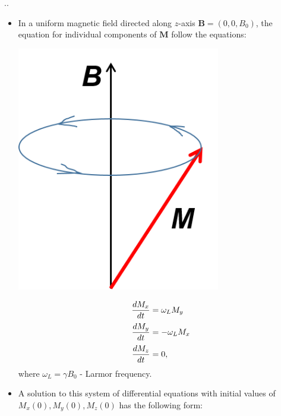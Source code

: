 \documentclass[handout]{beamer}
\begin{document}
\begin{frame}{\thesection.\thesubsection. \insertsubsection}
	\begin{itemize}[<+>]
		\item 
		    In a uniform magnetic field directed along $z$-axis $\bm{B} = (0, 0, B_0)$, the equation for individual components of $\bm{M}$ follow the equations:
		    
		    \begin{minipage}[b][4cm]{0.4\textwidth}
		    	\centering
		    	\includegraphics[width=0.7\textwidth]{precession.png}
		    \end{minipage}
		    \hspace{0.1cm}		    
		    \begin{minipage}[b][4cm]{0.4\textwidth}
		        \centering
		    	 \begin{equation} \label{precession}
		    	 \setlength{\jot}{5pt}
		    	 \begin{aligned}
		    	 \dfrac{dM_x}{dt} & =  \omega_L M_y \\
		    	 \dfrac{dM_y}{dt} & =  -\omega_L M_x \\
		    	 \dfrac{dM_z}{dt} & =  0,
		    	 \end{aligned}
		    	 \end{equation}
		    	 where $\omega_L = \gamma B_0$ - \alert{Larmor frequency}.
		    \end{minipage}
		    
		    
		\item
			A solution to this system of differential equations with initial values of $M_x(0), M_y(0), M_z(0)$ has the following form:
						

\end{itemize}
\end{frame}
\end{document}
